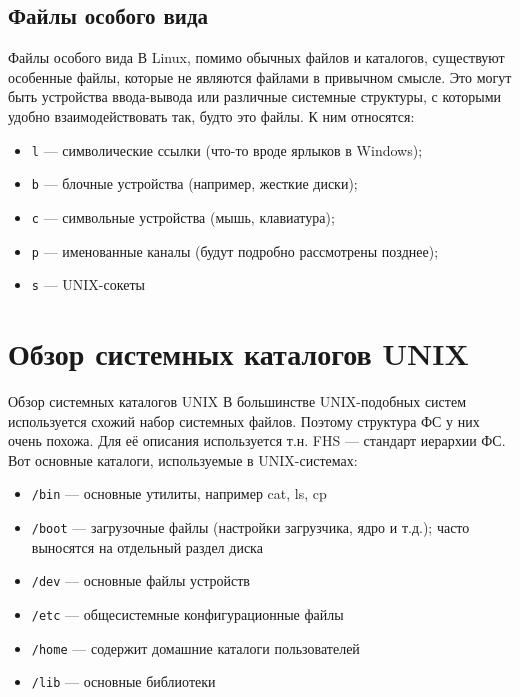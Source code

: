 \documentclass{beamer}
\begin{document}
\subsection{Файлы особого вида}
\begin{frame}{Файлы особого вида}
	В Linux, помимо обычных файлов и каталогов, существуют особенные файлы, которые не являются файлами в привычном смысле. Это могут быть устройства ввода-вывода или различные системные структуры, с которыми удобно взаимодействовать так, будто это файлы. К ним относятся: \pause
	\begin{itemize}
		\item{\texttt{l} --- символические ссылки (что-то вроде ярлыков в Windows);}\pause
		\item{\texttt{b} --- блочные устройства (например, жесткие диски);}\pause
		\item{\texttt{c} --- символьные устройства (мышь, клавиатура);}\pause
		\item{\texttt{p} --- именованные каналы (будут подробно рассмотрены позднее);}\pause
		\item{\texttt{s} --- UNIX-сокеты}
	\end{itemize}
\end{frame}

\section{Обзор системных каталогов UNIX}
\begin{frame}{Обзор системных каталогов UNIX}
	В большинстве UNIX-подобных систем используется схожий набор системных файлов. Поэтому структура ФС у них очень похожа. Для её описания используется т.н. FHS --- стандарт иерархии ФС. Вот основные каталоги, используемые в UNIX-системах:\pause
	\begin{itemize}
		\item{\texttt{/bin} --- основные утилиты, например cat, ls, cp}\pause
		\item{\texttt{/boot} --- загрузочные файлы (настройки загрузчика, ядро и т.д.); часто выносятся на отдельный раздел диска}\pause
		\item{\texttt{/dev} --- основные файлы устройств}\pause
		\item{\texttt{/etc} --- общесистемные конфигурационные файлы}\pause
		\item{\texttt{/home} --- содержит домашние каталоги пользователей}\pause
		\item{\texttt{/lib} --- основные библиотеки}
	\end{itemize}
\end{frame}
\end{document}

